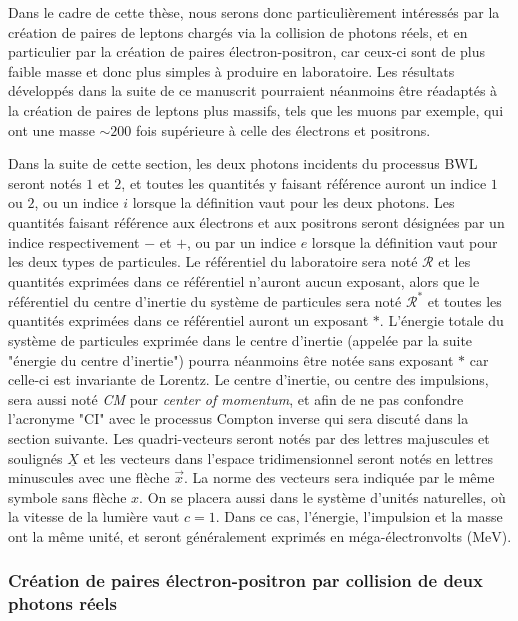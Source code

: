 \begin{refsection}
Dans le cadre de cette thèse, nous serons donc particulièrement intéressés par la création de paires de leptons chargés via la collision de photons réels, et en particulier par la création de paires électron-positron, car ceux-ci sont de plus faible masse et donc plus simples à produire en laboratoire. Les résultats développés dans la suite de ce manuscrit pourraient néanmoins être réadaptés à la création de paires de leptons plus massifs, tels que les muons par exemple, qui ont une masse $\sim 200$ fois supérieure à celle des électrons et positrons.

Dans la suite de cette section, les deux photons incidents du processus BWL seront notés $1$ et $2$, et toutes les quantités y faisant référence auront un indice $1$ ou $2$, ou un indice $i$ lorsque la définition vaut pour les deux photons. Les quantités faisant référence aux électrons et aux positrons seront désignées par un indice respectivement $-$ et $+$, ou par un indice $e$ lorsque la définition vaut pour les deux types de particules. Le référentiel du laboratoire sera noté $\mathcal{R}$ et les quantités exprimées dans ce référentiel n'auront aucun exposant, alors que le référentiel du centre d'inertie du système de particules sera noté $\mathcal{R}^*$ et toutes les quantités exprimées dans ce référentiel auront un exposant $*$. L'énergie totale du système de particules exprimée dans le centre d'inertie (appelée par la suite "énergie du centre d'inertie") pourra néanmoins être notée sans exposant $*$ car celle-ci est invariante de Lorentz. Le centre d'inertie, ou centre des impulsions, sera aussi noté \textit{CM} pour \textit{center of momentum}, et afin de ne pas confondre l'acronyme "CI" avec le processus Compton inverse qui sera discuté dans la section suivante. Les quadri-vecteurs seront notés par des lettres majuscules et soulignés $\underline{X}$ et les vecteurs dans l'espace tridimensionnel seront notés en lettres minuscules avec une flèche $\vec{x}$. La norme des vecteurs sera indiquée par le même symbole sans flèche $x$. On se placera aussi dans le système d'unités naturelles, où la vitesse de la lumière vaut $c=1$. Dans ce cas, l'énergie, l'impulsion et la masse ont la même unité, et seront généralement exprimés en méga-électronvolts ($\si{\MeV}$).

\subsubsection{Création de paires électron-positron par collision de deux photons réels}


\end{refsection}
